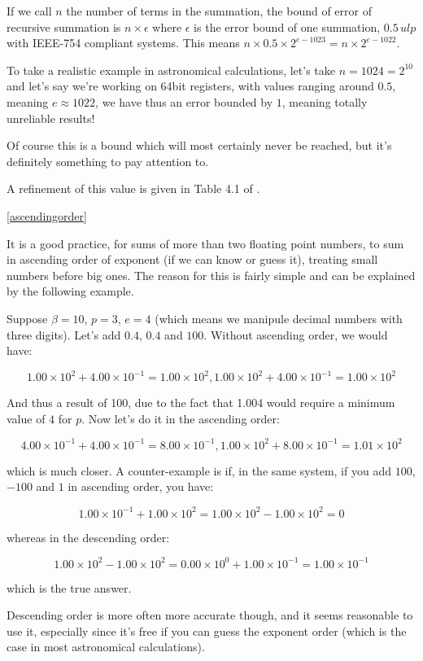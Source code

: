 If we call $n$ the number of terms in the summation, the bound of error of recursive summation is $n\times\epsilon$ where $\epsilon$ is the error bound of one summation, $0.5\,ulp$ with IEEE-754 compliant systems. This means $n\times0.5\times2^{e-1023} = n\times2^{e-1022}$.

To take a realistic example in astronomical calculations, let's take $n=1024=2^{10}$ and let's say we're working on 64bit registers, with values ranging around $0.5$, meaning $e\approx1022$, we have thus an error bounded by $1$, meaning totally unreliable results!

Of course this is a bound which will most certainly never be reached, but it's definitely something to pay attention to.

A refinement of this value is given in Table 4.1 of  \cite{Higham}.

\ref{ascendingorder}

It is a good practice, for sums of more than two floating point numbers, to sum in ascending order of exponent (if we can know or guess it), treating small numbers before big ones. The reason for this is fairly simple and can be explained by the following example.

Suppose $\beta=10$, $p=3$, $e=4$ (which means we manipule decimal numbers with three digits). Let's add $0.4$, $0.4$ and $100$. Without ascending order, we would have:

$$1.00\times 10^2 + 4.00\times 10^{-1} = 1.00\times 10^2, 1.00\times 10^2 + 4.00\times 10^{-1} = 1.00\times 10^2$$

And thus a result of 100, due to the fact that 1.004 would require a minimum value of $4$ for $p$. Now let's do it in the ascending order:

$$4.00\times 10^{-1} + 4.00\times 10^{-1} = 8.00\times 10^{-1}, 1.00\times 10^2 + 8.00 \times 10^{-1} = 1.01\times 10^2$$

which is much closer. A counter-example is if, in the same system, if you add $100$, $-100$ and $1$ in ascending order, you have:

$$1.00\times 10^{-1} + 1.00\times 10^{2} = 1.00\times 10^{2} - 1.00\times 10^{2} = 0$$

whereas in the descending order:

$$1.00\times 10^{2} - 1.00\times 10^{2} = 0.00\times 10^{0} + 1.00\times 10^{-1} = 1.00\times 10^{-1}$$

which is the true answer.

Descending order is more often more accurate though, and it seems reasonable to use it, especially since it's free if you can guess the exponent order (which is the case in most astronomical calculations).


